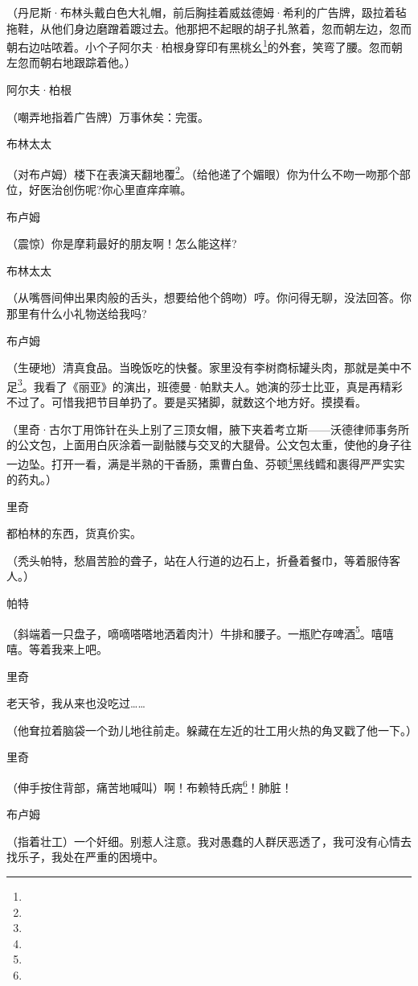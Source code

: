 \par （丹尼斯·布林头戴白色大礼帽，前后胸挂着威兹德姆·希利的广告牌，趿拉着毡拖鞋，从他们身边磨蹭着踱过去。他那把不起眼的胡子扎煞着，忽而朝左边，忽而朝右边咕哝着。小个子阿尔夫·柏根身穿印有黑桃幺\footnote{}的外套，笑弯了腰。忽而朝左忽而朝右地跟踪着他。）
\par 阿尔夫·柏根
\par （嘲弄地指着广告牌）万事休矣：完蛋。
\par 布林太太
\par （对布卢姆）楼下在表演天翻地覆\footnote{}。（给他递了个媚眼）你为什么不吻一吻那个部位，好医治创伤呢?你心里直痒痒嘛。
\par 布卢姆
\par （震惊）你是摩莉最好的朋友啊！怎么能这样?
\par 布林太太
\par （从嘴唇间伸出果肉般的舌头，想要给他个鸽吻）哼。你问得无聊，没法回答。你那里有什么小礼物送给我吗?
\par 布卢姆
\par （生硬地）清真食品。当晚饭吃的快餐。家里没有李树商标罐头肉，那就是美中不足\footnote{}。我看了《丽亚》的演出，班德曼·帕默夫人。她演的莎士比亚，真是再精彩不过了。可惜我把节目单扔了。要是买猪脚，就数这个地方好。摸摸看。
\par （里奇·古尔丁用饰针在头上别了三顶女帽，腋下夹着考立斯——沃德律师事务所的公文包，上面用白灰涂着一副骷髅与交叉的大腿骨。公文包太重，使他的身子往一边坠。打开一看，满是半熟的干香肠，熏曹白鱼、芬顿\footnote{}黑线鳕和裹得严严实实的药丸。）
\par 里奇
\par 都柏林的东西，货真价实。
\par （秃头帕特，愁眉苦脸的聋子，站在人行道的边石上，折叠着餐巾，等着服侍客人。）
\par 帕特
\par （斜端着一只盘子，嘀嘀嗒嗒地洒着肉汁）牛排和腰子。一瓶贮存啤酒\footnote{}。嘻嘻嘻。等着我来上吧。
\par 里奇
\par 老天爷，我从来也没吃过……
\par （他耷拉着脑袋一个劲儿地往前走。躲藏在左近的壮工用火热的角叉戳了他一下。）
\par 里奇
\par （伸手按住背部，痛苦地喊叫）啊！布赖特氏病\footnote{}！肺脏！
\par 布卢姆
\par （指着壮工）一个奸细。别惹人注意。我对愚蠢的人群厌恶透了，我可没有心情去找乐子，我处在严重的困境中。
